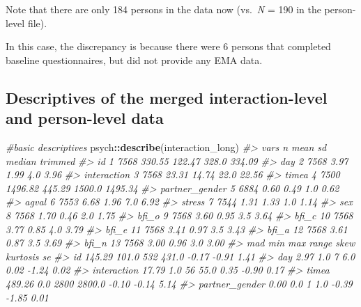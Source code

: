 \documentclass[
]{book}
\newenvironment{Shaded}{\begin{snugshade}}{\end{snugshade}}
\newcommand{\CommentTok}[1]{\textcolor[rgb]{0.56,0.35,0.01}{\textit{#1}}}
\newcommand{\FunctionTok}[1]{\textcolor[rgb]{0.13,0.29,0.53}{\textbf{#1}}}
\newcommand{\NormalTok}[1]{#1}
\newcommand{\SpecialCharTok}[1]{\textcolor[rgb]{0.81,0.36,0.00}{\textbf{#1}}}
\theoremstyle{definition}
\theoremstyle{definition}
\theoremstyle{definition}
\theoremstyle{definition}
\theoremstyle{remark}
\begin{document}
Note that there are only 184 persons in the data now (vs.~\emph{N} = 190 in the person-level file).

In this case, the discrepancy is because there were 6 persons that completed baseline questionnaires, but did not provide any EMA data.

\subsection{Descriptives of the merged interaction-level and person-level data}\label{descriptives-of-the-merged-interaction-level-and-person-level-data}

\begin{Shaded}
\begin{Highlighting}[]
\CommentTok{\#basic descriptives}
\NormalTok{psych}\SpecialCharTok{::}\FunctionTok{describe}\NormalTok{(interaction\_long)}
\CommentTok{\#\textgreater{}                vars    n    mean     sd median trimmed}
\CommentTok{\#\textgreater{} id                1 7568  330.55 122.47  328.0  334.09}
\CommentTok{\#\textgreater{} day               2 7568    3.97   1.99    4.0    3.96}
\CommentTok{\#\textgreater{} interaction       3 7568   23.31  14.74   22.0   22.56}
\CommentTok{\#\textgreater{} timea             4 7500 1496.82 445.29 1500.0 1495.34}
\CommentTok{\#\textgreater{} partner\_gender    5 6884    0.60   0.49    1.0    0.62}
\CommentTok{\#\textgreater{} agval             6 7553    6.68   1.96    7.0    6.92}
\CommentTok{\#\textgreater{} stress            7 7544    1.31   1.33    1.0    1.14}
\CommentTok{\#\textgreater{} sex               8 7568    1.70   0.46    2.0    1.75}
\CommentTok{\#\textgreater{} bfi\_o             9 7568    3.60   0.95    3.5    3.64}
\CommentTok{\#\textgreater{} bfi\_c            10 7568    3.77   0.85    4.0    3.79}
\CommentTok{\#\textgreater{} bfi\_e            11 7568    3.41   0.97    3.5    3.43}
\CommentTok{\#\textgreater{} bfi\_a            12 7568    3.61   0.87    3.5    3.69}
\CommentTok{\#\textgreater{} bfi\_n            13 7568    3.00   0.96    3.0    3.00}
\CommentTok{\#\textgreater{}                   mad   min  max  range  skew kurtosis   se}
\CommentTok{\#\textgreater{} id             145.29 101.0  532  431.0 {-}0.17    {-}0.91 1.41}
\CommentTok{\#\textgreater{} day              2.97   1.0    7    6.0  0.02    {-}1.24 0.02}
\CommentTok{\#\textgreater{} interaction     17.79   1.0   56   55.0  0.35    {-}0.90 0.17}
\CommentTok{\#\textgreater{} timea          489.26   0.0 2800 2800.0 {-}0.10    {-}0.14 5.14}
\CommentTok{\#\textgreater{} partner\_gender   0.00   0.0    1    1.0 {-}0.39    {-}1.85 0.01}

\end{Highlighting}
\end{Shaded}
\end{document}
